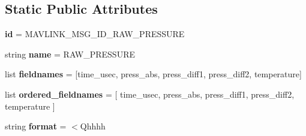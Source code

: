 \subsection*{Static Public Attributes}
\begin{DoxyCompactItemize}
\item 
\mbox{\label{classpymavlink_1_1dialects_1_1v10_1_1MAVLink__raw__pressure__message_a17ffad33a8f3e23eb0d7505b59bd7b27}} 
{\bfseries id} = M\+A\+V\+L\+I\+N\+K\+\_\+\+M\+S\+G\+\_\+\+I\+D\+\_\+\+R\+A\+W\+\_\+\+P\+R\+E\+S\+S\+U\+RE
\item 
\mbox{\label{classpymavlink_1_1dialects_1_1v10_1_1MAVLink__raw__pressure__message_a3484f595cf3576f48747a51ab63b74ac}} 
string {\bfseries name} = \textquotesingle{}R\+A\+W\+\_\+\+P\+R\+E\+S\+S\+U\+RE\textquotesingle{}
\item 
\mbox{\label{classpymavlink_1_1dialects_1_1v10_1_1MAVLink__raw__pressure__message_ab2089e1612e3fce3715be485e0e91e23}} 
list {\bfseries fieldnames} = \mbox{[}\textquotesingle{}time\+\_\+usec\textquotesingle{}, \textquotesingle{}press\+\_\+abs\textquotesingle{}, \textquotesingle{}press\+\_\+diff1\textquotesingle{}, \textquotesingle{}press\+\_\+diff2\textquotesingle{}, \textquotesingle{}temperature\textquotesingle{}\mbox{]}
\item 
\mbox{\label{classpymavlink_1_1dialects_1_1v10_1_1MAVLink__raw__pressure__message_a341eed9d24baccdde2a98a5f7323d4a5}} 
list {\bfseries ordered\+\_\+fieldnames} = \mbox{[} \textquotesingle{}time\+\_\+usec\textquotesingle{}, \textquotesingle{}press\+\_\+abs\textquotesingle{}, \textquotesingle{}press\+\_\+diff1\textquotesingle{}, \textquotesingle{}press\+\_\+diff2\textquotesingle{}, \textquotesingle{}temperature\textquotesingle{} \mbox{]}
\item 
\mbox{\label{classpymavlink_1_1dialects_1_1v10_1_1MAVLink__raw__pressure__message_ab410b9ea4afe87b728a04c5b3891a5ac}} 
string {\bfseries format} = \textquotesingle{}$<$Qhhhh\textquotesingle{}
\item 

\end{DoxyCompactItemize}
